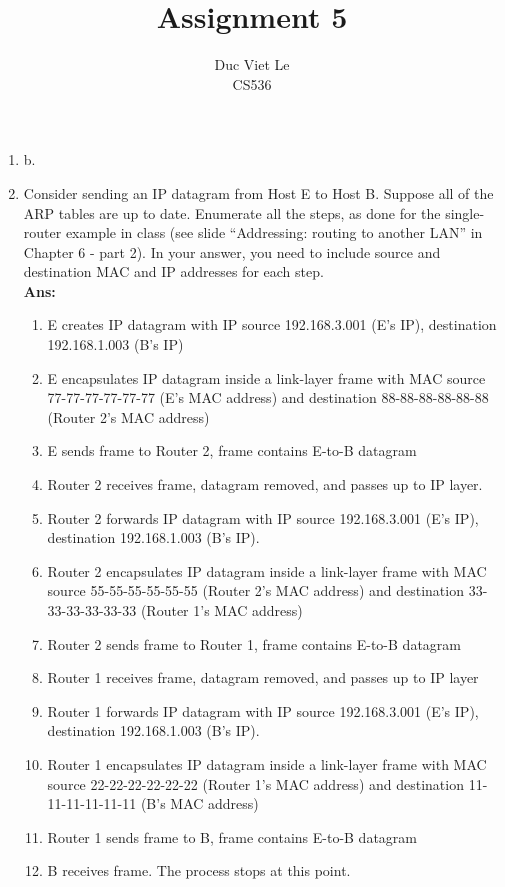 \documentclass[11pt]{article}
\newenvironment{problem}[2][Problem]{\begin{trivlist}
\item[\hskip \labelsep {\bfseries #1}\hskip \labelsep {\bfseries #2.}]}{\end{trivlist}}
\begin{document}
\title{Assignment 5}
\author{Duc Viet Le\\ CS536}
\maketitle
\begin{problem}{1}
\end{problem}
\begin{enumerate}
	\item[a. ] b. 
	\pagebreak 
	\item[c. ]
	Consider sending an IP datagram from Host E to Host B. Suppose all of the ARP tables
	are up to date. Enumerate all the steps, as done for the single-router example in class
	(see slide “Addressing: routing to another LAN” in Chapter 6 - part 2). In your answer,
	you need to include source and destination MAC and IP addresses for each step.
	\\
	\textbf{Ans:}
	\begin{enumerate}
		\item[1.] E creates IP datagram with IP source 192.168.3.001 (E's IP), destination 192.168.1.003 (B's IP)
		\item[2.] E encapsulates IP datagram inside a link-layer frame with MAC source 77-77-77-77-77-77 (E's MAC address) and destination 88-88-88-88-88-88 (Router 2's MAC address)
		\item[3.] E sends frame to Router 2, frame contains E-to-B datagram
		\item[4.] Router 2 receives frame, datagram removed, and passes up to IP layer.
		\item[5.] Router 2 forwards IP datagram with IP source 192.168.3.001 (E's IP), destination 192.168.1.003 (B's IP).
		\item[6.] Router 2 encapsulates IP datagram inside a link-layer frame with MAC source 55-55-55-55-55-55 (Router 2's MAC address) and destination 33-33-33-33-33-33 (Router 1's MAC address)
		\item[7.] Router 2 sends frame to Router 1, frame contains E-to-B datagram
		\item[8.] Router 1 receives frame, datagram removed, and passes up to IP layer
		\item[9.] Router 1 forwards IP datagram with IP source 192.168.3.001 (E's IP), destination 192.168.1.003 (B's IP).
		\item[10.] Router 1 encapsulates IP datagram inside a link-layer frame with MAC source 22-22-22-22-22-22 (Router 1's MAC address) and destination 11-11-11-11-11-11 (B's MAC address)
		\item[11.] Router 1 sends frame to B, frame contains E-to-B datagram
		\item [12.] B receives frame. The process stops at this point.


\end{enumerate}
\end{enumerate}
\end{document}

